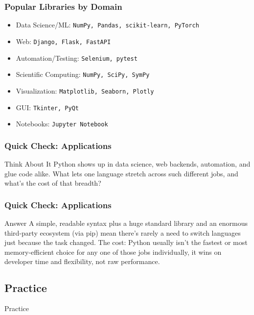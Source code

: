 \begin{frame}[fragile]\frametitle{Popular Libraries by Domain}
\begin{itemize}
\item Data Science/ML: \lstinline{NumPy, Pandas, scikit-learn, PyTorch}
\item Web: \lstinline{Django, Flask, FastAPI}
\item Automation/Testing: \lstinline{Selenium, pytest}
\item Scientific Computing: \lstinline{NumPy, SciPy, SymPy}
\item Visualization: \lstinline{Matplotlib, Seaborn, Plotly}
\item GUI: \lstinline{Tkinter, PyQt}
\item Notebooks: \lstinline{Jupyter Notebook}
\end{itemize}
\end{frame}

\begin{frame}[fragile]\frametitle{Quick Check: Applications}
\begin{block}{Think About It}
Python shows up in data science, web backends, automation, and glue code alike. What lets one language stretch across such different jobs, and what's the cost of that breadth?
\end{block}
\end{frame}

\begin{frame}[fragile]\frametitle{Quick Check: Applications}
\begin{block}{Answer}
A simple, readable syntax plus a huge standard library and an enormous third-party ecosystem (via pip) mean there's rarely a need to switch languages just because the task changed. The cost: Python usually isn't the fastest or most memory-efficient choice for any one of those jobs individually, it wins on developer time and flexibility, not raw performance.
\end{block}
\end{frame}

\subsection{Practice}
\begin{frame}
  \begin{center}
    {\Large Practice}
  \end{center}
\end{frame}

